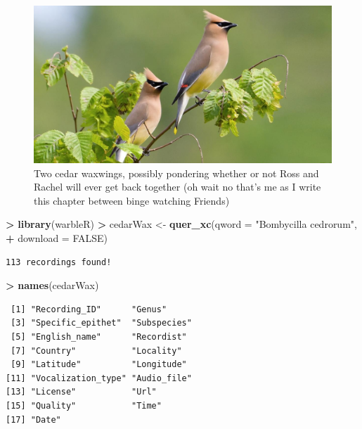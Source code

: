 \documentclass[]{krantz}
\makeatletter
\newenvironment{Shaded}{\begin{snugshade}}{\end{snugshade}}
\newcommand{\KeywordTok}[1]{\textcolor[rgb]{0.27,0.27,0.27}{\textbf{#1}}}
\newcommand{\DataTypeTok}[1]{\textcolor[rgb]{0.27,0.27,0.27}{#1}}
\newcommand{\StringTok}[1]{\textcolor[rgb]{0.5,0.5,0.5}{#1}}
\newcommand{\OtherTok}[1]{\textcolor[rgb]{0.37,0.37,0.37}{#1}}
\newcommand{\OperatorTok}[1]{\textcolor[rgb]{0.43,0.43,0.43}{\textbf{#1}}}
\newcommand{\NormalTok}[1]{#1}
\newenvironment{kframe}{%
\medskip{}
\setlength{\fboxsep}{.8em}
 \def\at@end@of@kframe{}%
 \ifinner\ifhmode%
  \def\at@end@of@kframe{\end{minipage}}%
  \begin{minipage}{\columnwidth}%
 \fi\fi%
 \def\FrameCommand##1{\hskip\@totalleftmargin \hskip-\fboxsep
 \colorbox{shadecolor}{##1}\hskip-\fboxsep
     \hskip-\linewidth \hskip-\@totalleftmargin \hskip\columnwidth}%
 \MakeFramed {\advance\hsize-\width
   \@totalleftmargin\z@ \linewidth\hsize
   \@setminipage}}%
 {\par\unskip\endMakeFramed%
 \at@end@of@kframe}
\renewenvironment{Shaded}{\begin{kframe}}{\end{kframe}}
\makeatother
\begin{document}
\begin{figure}
\includegraphics[width=1\linewidth]{figures/cedarWaxwing} \caption{Two cedar waxwings, possibly pondering whether or not Ross and Rachel will ever get back together (oh wait no that's me as I write this chapter between binge watching Friends)}\label{fig:waxwing}
\end{figure}

\begin{Shaded}
\begin{Highlighting}[]
\OperatorTok{>}\StringTok{ }\KeywordTok{library}\NormalTok{(warbleR)}
\OperatorTok{>}\StringTok{ }\NormalTok{cedarWax <-}\StringTok{ }\KeywordTok{quer_xc}\NormalTok{(}\DataTypeTok{qword =} \StringTok{"Bombycilla cedrorum"}\NormalTok{,}
\OperatorTok{+}\StringTok{                     }\DataTypeTok{download =} \OtherTok{FALSE}\NormalTok{)}
\end{Highlighting}
\end{Shaded}

\begin{verbatim}
113 recordings found!
\end{verbatim}

\begin{Shaded}
\begin{Highlighting}[]
\OperatorTok{>}\StringTok{ }\KeywordTok{names}\NormalTok{(cedarWax)}
\end{Highlighting}
\end{Shaded}

\begin{verbatim}
 [1] "Recording_ID"      "Genus"            
 [3] "Specific_epithet"  "Subspecies"       
 [5] "English_name"      "Recordist"        
 [7] "Country"           "Locality"         
 [9] "Latitude"          "Longitude"        
[11] "Vocalization_type" "Audio_file"       
[13] "License"           "Url"              
[15] "Quality"           "Time"             
[17] "Date"             
\end{verbatim}
\end{document}

